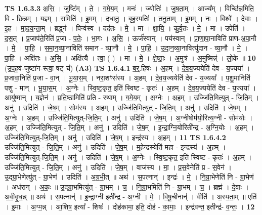 \documentclass[17pt]{extarticle}
\begin{document}
                  \newline
                                \textbf{ TS 1.6.3.3} \newline
                  अ॒सि॒ । जुष्टि᳚म् । ते॒ । ग॒मे॒य॒म् । मनः॑ । ज्योतिः॑ । जु॒ष॒ता॒म् । आज्य᳚म् । विच्छि॑न्न॒मिति॒ वि - छि॒न्न॒म् । य॒ज्ञ्म् । समिति॑ । इ॒मम् । द॒धा॒तु॒ । बृह॒स्पतिः॑ । त॒नु॒ता॒म् । इ॒मम् । नः॒ । विश्वे᳚ । दे॒वाः । इ॒ह । मा॒द॒य॒न्ता॒म् । ब्रद्ध्न॑ । पिन्व॑स्व । दद॑तः । मे॒ । मा । क्षा॒यि॒ । कु॒र्व॒तः । मे॒ । मा । उपेति॑ । द॒स॒त् । प्र॒जाप॑ते॒रिति॑ प्र॒जा - प॒तेः॒ । भा॒गः । अ॒सि॒ । ऊर्ज॑स्वान् । पय॑स्वान् । प्रा॒णा॒पा॒नाविति॑ प्राण-अ॒पा॒नौ । मे॒ । पा॒हि॒ । स॒मा॒न॒व्या॒नाविति॑ समान - व्या॒नौ । मे॒ । पा॒हि॒ । उ॒दा॒न॒व्या॒नावित्यु॑दान - व्या॒नौ । मे॒ । पा॒हि॒ । अक्षि॑तः । अ॒सि॒ । अक्षि॑त्यै । त्वा॒ ( ) । मा । मे॒ । क्षे॒ष्ठाः॒ । अ॒मुत्र॑ । अ॒मुष्मिन्न्॑ । लो॒के ॥ \textbf{  10} \newline
                  \newline
                      (उ॒प॒ह॒वं-जुष्टा॑न-स्त्वा॒ षट् च॑)  \textbf{(A3)} \newline \newline
                                \textbf{ TS 1.6.4.1} \newline
                  ब॒र्॒.हिषः॑ । अ॒हम् । दे॒व॒य॒ज्ययेति॑ देव - य॒ज्यया᳚ । प्र॒जावा॒निति॑ प्र॒जा - वा॒न् । भू॒या॒स॒म् । नरा॒शꣳस॑स्य । अ॒हम् । दे॒व॒य॒ज्ययेति॑ देव - य॒ज्यया᳚ । प॒शु॒मानिति॑ पशु - मान् । भू॒या॒स॒म् । अ॒ग्नेः । स्वि॒ष्ट॒कृत॒ इति॑ स्विष्ट - कृतः॑ । अ॒हम् । दे॒व॒य॒ज्ययेति॑ देव - य॒ज्यया᳚ । आयु॑ष्मान् । य॒ज्ञेन॑ । प्र॒ति॒ष्ठामिति॑ प्रति - स्थाम् । ग॒मे॒य॒म् । अ॒ग्नेः । अ॒हम् । उज्जि॑ति॒मित्युत् - जि॒ति॒म् । अनु॑ । उदिति॑ । जे॒ष॒म् । सोम॑स्य । अ॒हम् । उज्जि॑ति॒मित्युत् - जि॒ति॒म् । अनु॑ । उदिति॑ । जे॒ष॒म् । अ॒ग्नेः । अ॒हम् । उज्जि॑ति॒मित्युत्-जि॒ति॒म् । अनु॑ । उदिति॑ । जे॒ष॒म् । अ॒ग्नीषोम॑यो॒रित्य॒ग्नी - सोम॑योः । अ॒हम् । उज्जि॑ति॒मित्युत् - जि॒ति॒म् । अनु॑ । उदिति॑ । जे॒ष॒म् । इ॒न्द्रा॒ग्नि॒योरिती᳚न्द्र - अ॒ग्नि॒योः । अ॒हम् । उज्जि॑ति॒मित्युत्-जि॒ति॒म् । अनु॑ । उदिति॑ । जे॒ष॒म् । इन्द्र॑स्य । अ॒हम् । \textbf{  11} \newline
                  \newline
                                \textbf{ TS 1.6.4.2} \newline
                  उज्जि॑ति॒मित्युत् - जि॒ति॒म् । अनु॑ । उदिति॑ । जे॒ष॒म् । म॒हे॒न्द्रस्येति॑ महा - इ॒न्द्रस्य॑ । अ॒हम् । उज्जि॑ति॒मित्युत्-जि॒ति॒म् । अनु॑ । उदिति॑ । जे॒ष॒म् । अ॒ग्नेः । स्वि॒ष्ट॒कृत॒ इति॑ स्विष्ट - कृतः॑ । अ॒हम् । उज्जि॑ति॒मित्युत् - जि॒ति॒म् । अनु॑ । उदिति॑ । जे॒ष॒म् । वाज॑स्य । मा॒ । प्र॒स॒वेनेति॑ प्र - स॒वेन॑ । उ॒द्ग्रा॒भेणेत्यु॑त् - ग्रा॒भेण॑ । उदिति॑ । अ॒ग्र॒भी॒त् ॥ अथ॑ । स॒पत्नान्॑ । इन्द्रः॑ । मे॒ । नि॒ग्रा॒भेणेति॑ नि - ग्रा॒भेण॑ । अध॑रान् । अ॒कः॒ ॥ उ॒द्ग्रा॒भमित्यु॑त् - ग्रा॒भम् । च॒ । नि॒ग्रा॒भमिति॑ नि - ग्रा॒भम् । च॒ । ब्रह्म॑ । दे॒वाः । अ॒वी॒वृ॒ध॒न्न् ॥ अथ॑ । स॒पत्नान्॑ । इ॒न्द्रा॒ग्नी इती᳚न्द्र - अ॒ग्नी । मे॒ । वि॒षू॒चीनान्॑ । वीति॑ । अ॒स्य॒ता॒म् ॥ एति॑ । इ॒माः । अ॒ग्म॒न्न् । आ॒शिष॒ इत्या᳚ - शिषः॑ । दोह॑कामा॒ इति॒ दोह॑ - का॒माः॒ । इन्द्र॑वन्त॒ इतीन्द्र॑- व॒न्तः॒ । \textbf{  12} \newline
\end{document}
